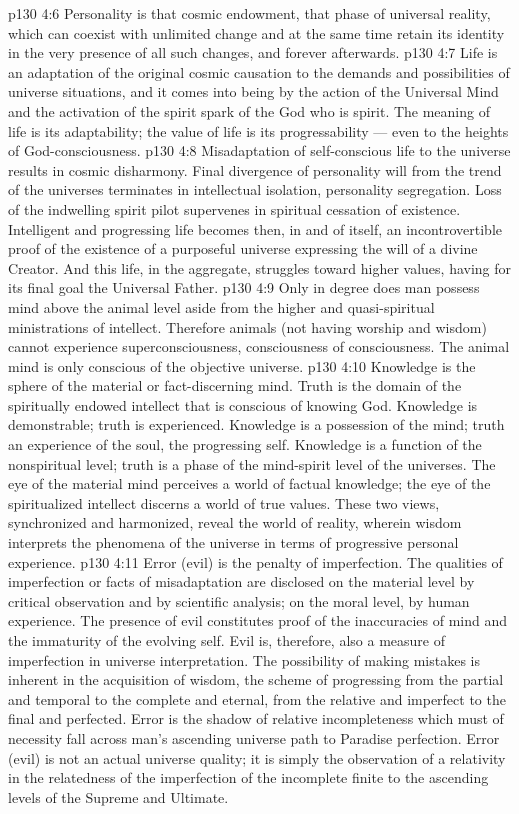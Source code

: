 \vs p130 4:6 Personality is that cosmic endowment, that phase of universal reality, which can coexist with unlimited change and at the same time retain its identity in the very presence of all such changes, and forever afterwards.
\vs p130 4:7 Life is an adaptation of the original cosmic causation to the demands and possibilities of universe situations, and it comes into being by the action of the Universal Mind and the activation of the spirit spark of the God who is spirit. The meaning of life is its adaptability; the value of life is its progressability --- even to the heights of God\hyp{}consciousness.
\vs p130 4:8 Misadaptation of self\hyp{}conscious life to the universe results in cosmic disharmony. Final divergence of personality will from the trend of the universes terminates in intellectual isolation, personality segregation. Loss of the indwelling spirit pilot supervenes in spiritual cessation of existence. Intelligent and progressing life becomes then, in and of itself, an incontrovertible proof of the existence of a purposeful universe expressing the will of a divine Creator. And this life, in the aggregate, struggles toward higher values, having for its final goal the Universal Father.
\vs p130 4:9 Only in degree does man possess mind above the animal level aside from the higher and quasi\hyp{}spiritual ministrations of intellect. Therefore animals (not having worship and wisdom) cannot experience superconsciousness, consciousness of consciousness. The animal mind is only conscious of the objective universe.
\vs p130 4:10 Knowledge is the sphere of the material or fact\hyp{}discerning mind. Truth is the domain of the spiritually endowed intellect that is conscious of knowing God. Knowledge is demonstrable; truth is experienced. Knowledge is a possession of the mind; truth an experience of the soul, the progressing self. Knowledge is a function of the nonspiritual level; truth is a phase of the mind\hyp{}spirit level of the universes. The eye of the material mind perceives a world of factual knowledge; the eye of the spiritualized intellect discerns a world of true values. These two views, synchronized and harmonized, reveal the world of reality, wherein wisdom interprets the phenomena of the universe in terms of progressive personal experience.
\vs p130 4:11 Error (evil) is the penalty of imperfection. The qualities of imperfection or facts of misadaptation are disclosed on the material level by critical observation and by scientific analysis; on the moral level, by human experience. The presence of evil constitutes proof of the inaccuracies of mind and the immaturity of the evolving self. Evil is, therefore, also a measure of imperfection in universe interpretation. The possibility of making mistakes is inherent in the acquisition of wisdom, the scheme of progressing from the partial and temporal to the complete and eternal, from the relative and imperfect to the final and perfected. Error is the shadow of relative incompleteness which must of necessity fall across man’s ascending universe path to Paradise perfection. Error (evil) is not an actual universe quality; it is simply the observation of a relativity in the relatedness of the imperfection of the incomplete finite to the ascending levels of the Supreme and Ultimate.
